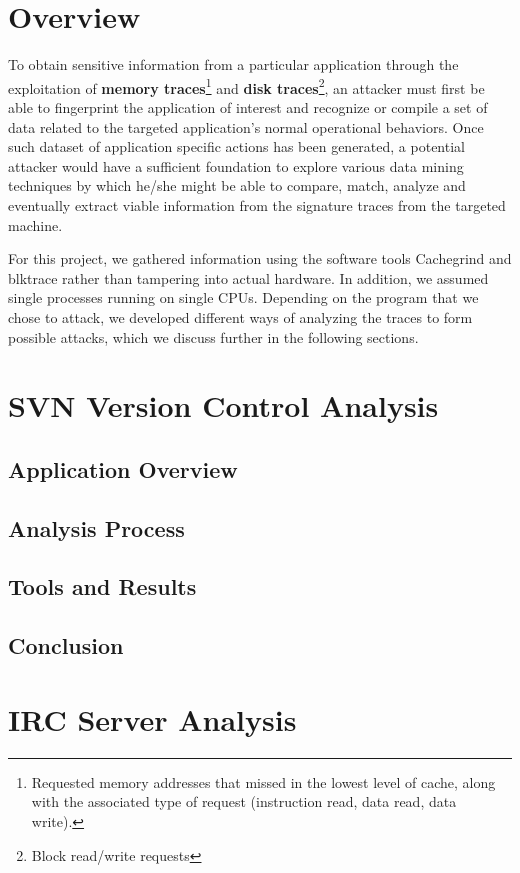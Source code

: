 \documentclass[11pt, oneside]{article}
\begin{document}
\section{Overview}
To obtain sensitive information from a particular application through the 
exploitation of \textbf{memory traces}\footnote{Requested memory addresses 
that missed in the lowest level of cache, along with the associated type of 
request (instruction read, data read, data write).} and 
\textbf{disk traces}\footnote{Block read/write requests}, an attacker must 
first be able to fingerprint the application of interest and recognize or 
compile a set of data related to the targeted application's normal operational 
behaviors. Once such dataset of application specific actions has been 
generated, a potential attacker would have a sufficient foundation to explore 
various data mining techniques by which he/she might be able to compare, 
match, analyze and eventually extract viable information from the signature 
traces from the targeted machine.

For this project, we gathered information using the software tools Cachegrind
and blktrace rather than tampering into actual hardware. In addition, we 
assumed single processes running on single CPUs. Depending on the program that 
we chose to attack, we developed different ways of analyzing the traces to
form possible attacks, which we discuss further in the following sections.


\section{SVN Version Control Analysis}
\subsection{Application Overview}
\subsection{Analysis Process}
\subsection{Tools and Results}
\subsection{Conclusion}

\section{IRC Server Analysis}
\end{document}

